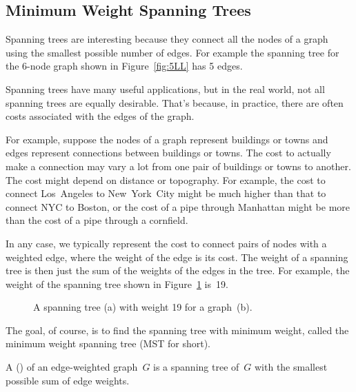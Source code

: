 \subsection{Minimum Weight Spanning Trees}\label{MST_subsec}

Spanning trees are interesting because they connect all the nodes of a
graph using the smallest possible number of edges.  For example the
spanning tree for the 6-node graph shown in Figure~\ref{fig:5LL} has 5
edges.

Spanning trees have many useful applications, but in the real world, not
all spanning trees are equally desirable.  That's because, in
practice, there are often costs associated with the edges of the graph.

For example, suppose the nodes of a graph represent buildings or towns
and edges represent connections between buildings or towns.  The cost
to actually make a connection may vary a lot from one pair of
buildings or towns to another.  The cost might depend on distance or
topography.  For example, the cost to connect Los~Angeles to
New~York~City might be much higher than that to connect NYC to Boston,
or the cost of a pipe through Manhattan might be more than the cost of
a pipe through a cornfield.

In any case, we typically represent the cost to connect pairs of nodes
with a weighted edge, where the weight of the edge is its cost.  The
weight of a spanning tree is then just the sum of the weights of the
edges in the tree.  For example, the weight of the spanning tree shown
in Figure~\ref{fig:5KA} is~19.

\begin{figure}

%
\qquad
%

\caption{A spanning tree (a) with weight 19 for a graph~(b).}

\label{fig:5KA}

\end{figure}

The goal, of course, is to find the spanning tree with minimum weight,
called the minimum weight spanning tree (MST for short).

\begin{definition}
A  (\textup{}\textup) of
an edge-weighted graph~$G$ is a spanning tree of~$G$ with the
smallest possible sum of edge weights.
\end{definition}


